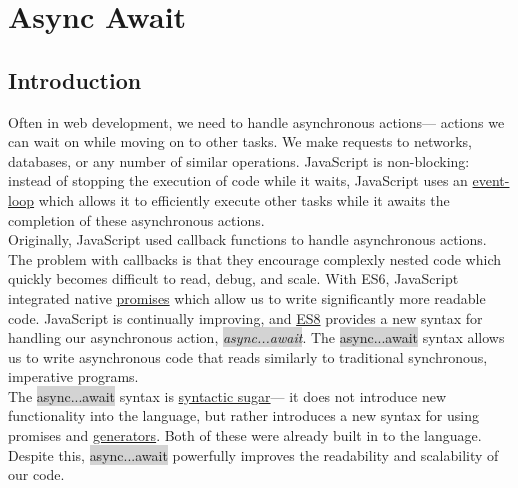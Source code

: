 \documentclass[11pt]{article}
\begin{document}
\newpage
\section{Async Await}
\subsection{Introduction}
Often in web development, we need to handle asynchronous actions— actions we can wait on while moving on to other tasks. We make requests to networks, databases, or any number of similar operations. JavaScript is non-blocking: instead of stopping the execution of code while it waits, JavaScript uses an \href{https://www.youtube.com/watch?v=8aGhZQkoFbQ&feature=youtu.be}{event-loop} which allows it to efficiently execute other tasks while it awaits the completion of these asynchronous actions. \\
\newline
Originally, JavaScript used callback functions to handle asynchronous actions. The problem with callbacks is that they encourage complexly nested code which quickly becomes difficult to read, debug, and scale. With ES6, JavaScript integrated native \href{https://developer.mozilla.org/en-US/docs/Web/JavaScript/Reference/Global_Objects/Promise}{promises} which allow us to write significantly more readable code. JavaScript is continually improving, and \href{https://en.wikipedia.org/wiki/ECMAScript#8th_Edition_-_ECMAScript_2017}{ES8} provides a new syntax for handling our asynchronous action, \colorbox{lightgray}{\textit{async...await}}. The \colorbox{lightgray}{async...await} syntax allows us to write asynchronous code that reads similarly to traditional synchronous, imperative programs. \\
\newline
The \colorbox{lightgray}{async...await} syntax is \href{https://en.wikipedia.org/wiki/Syntactic_sugar}{syntactic sugar}— it does not introduce new functionality into the language, but rather introduces a new syntax for using promises and \href{https://developer.mozilla.org/en-US/docs/Web/JavaScript/Reference/Global_Objects/Generator}{generators}. Both of these were already built in to the language. Despite this, \colorbox{lightgray}{async...await} powerfully improves the readability and scalability of our code. 
\end{document}
